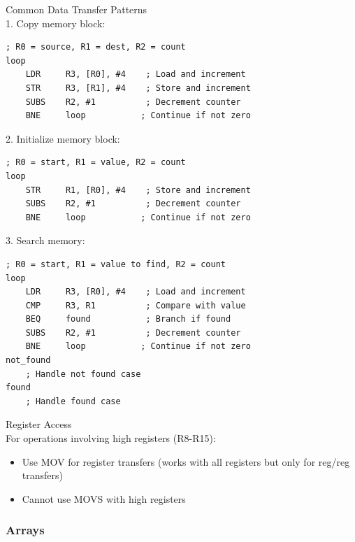 \begin{KR}{Common Data Transfer Patterns}\\
1. Copy memory block:
\begin{lstlisting}[language=armasm, style=basesmol]
    ; R0 = source, R1 = dest, R2 = count
loop
    LDR     R3, [R0], #4    ; Load and increment
    STR     R3, [R1], #4    ; Store and increment
    SUBS    R2, #1          ; Decrement counter
    BNE     loop           ; Continue if not zero
\end{lstlisting}

2. Initialize memory block:
\begin{lstlisting}[language=armasm, style=basesmol]
    ; R0 = start, R1 = value, R2 = count
loop
    STR     R1, [R0], #4    ; Store and increment
    SUBS    R2, #1          ; Decrement counter
    BNE     loop           ; Continue if not zero
\end{lstlisting}

3. Search memory:
\begin{lstlisting}[language=armasm, style=basesmol]
    ; R0 = start, R1 = value to find, R2 = count
loop
    LDR     R3, [R0], #4    ; Load and increment
    CMP     R3, R1          ; Compare with value
    BEQ     found           ; Branch if found
    SUBS    R2, #1          ; Decrement counter
    BNE     loop           ; Continue if not zero
not_found
    ; Handle not found case
found
    ; Handle found case
\end{lstlisting}
\end{KR}

\begin{concept}{Register Access}\\
For operations involving high registers (R8-R15):
\begin{itemize}
  \item Use MOV for register transfers (works with all registers but only for reg/reg transfers)
  \item Cannot use MOVS with high registers
\end{itemize}
\end{concept}

\columnbreak

\subsubsection{Arrays}

